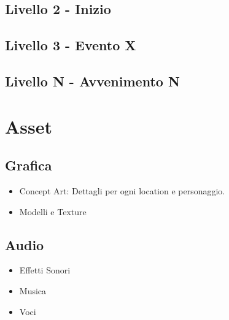 \documentclass{report}
\begin{document}
\subsection{Livello 2 - Inizio}
\subsection{Livello 3 - Evento X}
\subsection{Livello N - Avvenimento N}

\section{Asset}
\subsection{Grafica}
\begin{itemize}
    \item Concept Art: Dettagli per ogni location e personaggio.
    \item Modelli e Texture
\end{itemize}

\subsection{Audio}
\begin{itemize}
    \item Effetti Sonori
    \item Musica
    \item Voci
\end{itemize}
\end{document}
